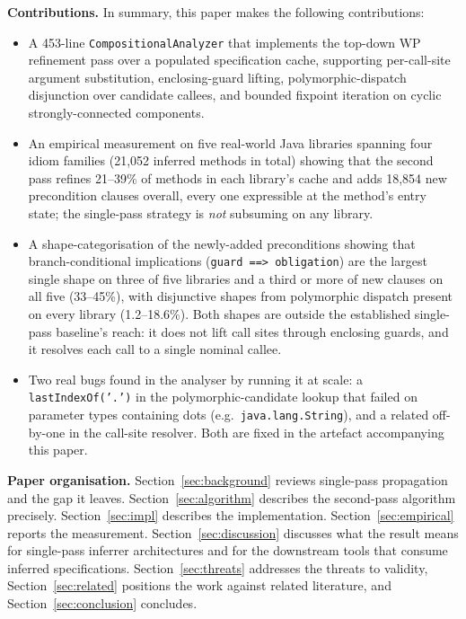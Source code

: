 \textbf{Contributions.} In summary, this paper makes the following
contributions:

\begin{itemize}\setlength\itemsep{0.2em}
  \item A 453-line \texttt{CompositionalAnalyzer} that implements the
        top-down WP refinement pass over a populated specification
        cache, supporting per-call-site argument substitution,
        enclosing-guard lifting, polymorphic-dispatch disjunction over
        candidate callees, and bounded fixpoint iteration on cyclic
        strongly-connected components.
  \item An empirical measurement on five real-world Java libraries
        spanning four idiom families
        (21{,}052 inferred methods in total) showing that the second
        pass refines 21--39\% of methods in each library's cache and
        adds 18{,}854 new precondition clauses overall, every one
        expressible at the method's entry state; the single-pass
        strategy is \emph{not} subsuming on any library.
  \item A shape-categorisation of the newly-added preconditions
        showing that branch-conditional implications
        (\texttt{guard ==> obligation}) are the largest single shape on
        three of five libraries and a third or more of new clauses on
        all five (33--45\%), with disjunctive shapes
        from polymorphic dispatch present on every library
        (1.2--18.6\%). Both shapes are outside the established
        single-pass baseline's reach: it does not lift call sites
        through enclosing guards, and it resolves each call to a
        single nominal callee.
  \item Two real bugs found in the analyser by running it at scale: a
        \texttt{lastIndexOf('.')} in the polymorphic-candidate lookup
        that failed on parameter types containing dots
        (e.g.\ \texttt{java.lang.String}), and a related off-by-one
        in the call-site resolver. Both are fixed in the artefact
        accompanying this paper.
\end{itemize}

\textbf{Paper organisation.} Section~\ref{sec:background} reviews
single-pass propagation and the gap it leaves. Section~\ref{sec:algorithm}
describes the second-pass algorithm precisely.
Section~\ref{sec:impl} describes the implementation.
Section~\ref{sec:empirical} reports the measurement.
Section~\ref{sec:discussion} discusses what the result means for
single-pass inferrer architectures and for the downstream tools that
consume inferred specifications. Section~\ref{sec:threats} addresses
the threats to validity, Section~\ref{sec:related} positions the work
against related literature, and Section~\ref{sec:conclusion} concludes.
